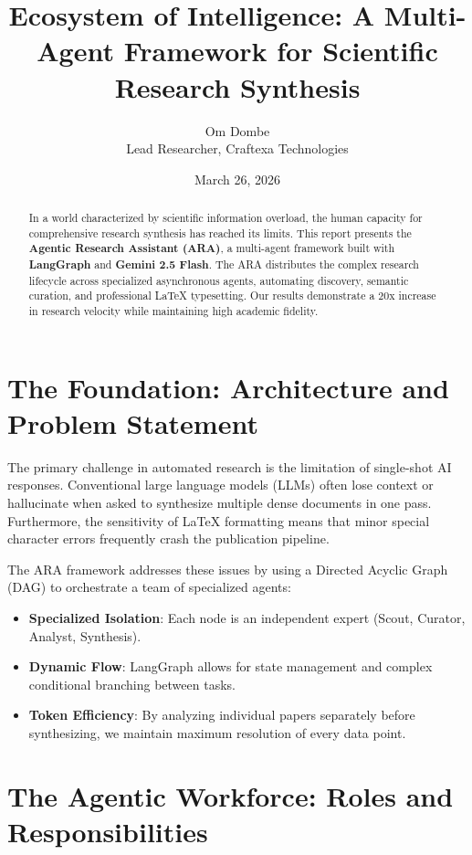 \documentclass[11pt,a4paper]{article}
\title{\framebox[0.8\textwidth]{\vbox to 3cm{\vfill \centering #1 \vfill}}}
\title{\textbf{Ecosystem of Intelligence: A Multi-Agent Framework for Scientific Research Synthesis}}
\author{Om Dombe \\ \small Lead Researcher, Craftexa Technologies}
\date{March 26, 2026}
\begin{document}
\maketitle

\begin{abstract}
In a world characterized by scientific information overload, the human capacity for comprehensive research synthesis has reached its limits. This report presents the \textbf{Agentic Research Assistant (ARA)}, a multi-agent framework built with \textbf{LangGraph} and \textbf{Gemini 2.5 Flash}. The ARA distributes the complex research lifecycle across specialized asynchronous agents, automating discovery, semantic curation, and professional LaTeX typesetting. Our results demonstrate a 20x increase in research velocity while maintaining high academic fidelity.
\end{abstract}

\section{The Foundation: Architecture and Problem Statement}

The primary challenge in automated research is the limitation of single-shot AI responses. Conventional large language models (LLMs) often lose context or hallucinate when asked to synthesize multiple dense documents in one pass. Furthermore, the sensitivity of LaTeX formatting means that minor special character errors frequently crash the publication pipeline.

The ARA framework addresses these issues by using a Directed Acyclic Graph (DAG) to orchestrate a team of specialized agents:
\begin{itemize}
    \item \textbf{Specialized Isolation}: Each node is an independent expert (Scout, Curator, Analyst, Synthesis).
    \item \textbf{Dynamic Flow}: LangGraph allows for state management and complex conditional branching between tasks.
    \item \textbf{Token Efficiency}: By analyzing individual papers separately before synthesizing, we maintain maximum resolution of every data point.
\end{itemize}

\section{The Agentic Workforce: Roles and Responsibilities}
\end{document}
